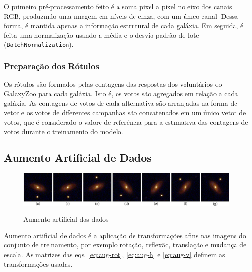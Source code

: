 O primeiro pré-processamento feito é a soma pixel a pixel no eixo dos canais RGB, produzindo uma imagem em níveis de cinza, com um único canal. Dessa forma, é mantida apenas a informação estrutural de cada galáxia. Em seguida, é feita uma normalização usando a média e o desvio padrão do lote (\texttt{BatchNormalization}).


\subsubsection{Preparação dos Rótulos}
\label{sec:modelo-prep-labels}
Os rótulos são formados pelas contagens das respostas dos voluntários do GalaxyZoo para cada galáxia. Isto é, os votos são agregados em relação a cada galáxia. As contagens de votos de cada alternativa são arranjadas na forma de vetor e os votos de diferentes campanhas são concatenados em um único vetor de votos, que é considerado o valore de referência para a estimativa das contagens de votos durante o treinamento do modelo.





\subsection{Aumento Artificial de Dados}
\label{sec:modelo-dataaug}

\begin{figure}[!ht]
  \centering
  \caption{Aumento artificial dos dados}
  \includegraphics[width=\linewidth]{figures/dataaug.pdf}
  \label{fig:dataaug}
\end{figure}

Aumento artificial de dados \cite{Larry1996} é a aplicação de transformações afins nas imagens do conjunto de treinamento, por exemplo rotação, reflexão, translação e mudança de escala. As matrizes das eqs. \eqref{eq:aug-rot}, \eqref{eq:aug-h} e \eqref{eq:aug-v} definem as transformações usadas.


